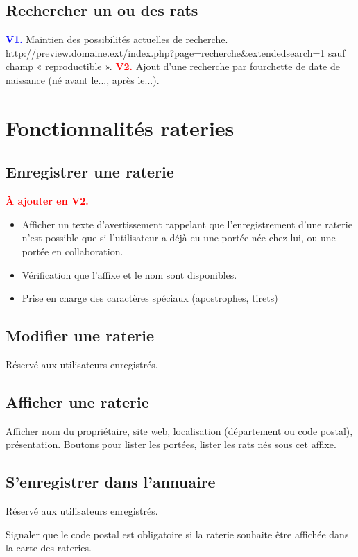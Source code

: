 \documentclass[a4paper,10pt]{article}
\newcommand\existant[1]{\noindent\textbf{\textcolor{blue}{#1}}}
\newcommand\desire[1]{\noindent\textbf{\textcolor{red}{#1}}}
\begin{document}
\subsection{Rechercher un ou des rats}

\existant{V1.} Maintien des possibilités actuelles de recherche. \url{http://preview.domaine.ext/index.php?page=recherche&extendedsearch=1} sauf champ « reproductible ».  
\desire{V2.} Ajout d'une recherche par fourchette de date de naissance (né avant le..., après le...).

\section{Fonctionnalités rateries}

\subsection{Enregistrer une raterie}

\desire{\`A ajouter en V2.} 
\begin{itemize}
\item Afficher un texte d'avertissement rappelant que l'enregistrement d'une raterie n'est possible que si l'utilisateur a déjà eu une portée née chez lui, ou une portée en collaboration.
\item Vérification que l'affixe et le nom sont disponibles. 
\item Prise en charge des caractères spéciaux (apostrophes, tirets)
\end{itemize}

\subsection{Modifier une raterie}
Réservé aux utilisateurs enregistrés.

\subsection{Afficher une raterie}
Afficher nom du propriétaire, site web, localisation (département ou code postal), présentation. Boutons pour lister les portées, lister les rats nés sous cet affixe.
\subsection{S'enregistrer dans l'annuaire}
Réservé aux utilisateurs enregistrés.

Signaler que le code postal est obligatoire si la raterie souhaite être affichée dans la carte des rateries.
\end{document}
